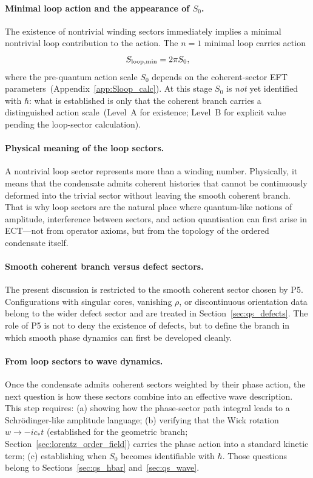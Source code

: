 \paragraph{Minimal loop action and the appearance of $S_0$.}
The existence of nontrivial winding sectors immediately implies a
minimal nontrivial loop contribution to the action.
The $n=1$ minimal loop carries action
\begin{equation}
  \label{eq:qs_loop_min}
  S_{\rm loop,min} = 2\pi S_0,
\end{equation}
where the pre-quantum action scale $S_0$ depends on the coherent-sector
EFT parameters~(Appendix~\ref{app:Sloop_calc}).
At this stage $S_0$ is \emph{not} yet identified with $\hbar$: what
is established is only that the coherent branch carries a distinguished
action scale~(Level~A for existence; Level~B for explicit value pending
the loop-sector calculation).

\paragraph{Physical meaning of the loop sectors.}
A nontrivial loop sector represents more than a winding number.
Physically, it means that the condensate admits coherent histories that
cannot be continuously deformed into the trivial sector without leaving
the smooth coherent branch.
That is why loop sectors are the natural place where quantum-like
notions of amplitude, interference between sectors, and action
quantisation can first arise in ECT---not from operator axioms, but
from the topology of the ordered condensate itself.

\paragraph{Smooth coherent branch versus defect sectors.}
The present discussion is restricted to the smooth coherent sector
chosen by P5.
Configurations with singular cores, vanishing $\rho$, or
discontinuous orientation data belong to the wider defect sector
and are treated in Section~\ref{sec:qs_defects}.
The role of P5 is not to deny the existence of defects, but to define
the branch in which smooth phase dynamics can first be developed
cleanly.

\paragraph{From loop sectors to wave dynamics.}
Once the condensate admits coherent sectors weighted by their phase
action, the next question is how these sectors combine into an
effective wave description.
This step requires: (a) showing how the phase-sector path integral
leads to a Schr\"odinger-like amplitude language; (b) verifying that
the Wick rotation $w\to -ic_*t$ (established for the geometric branch;
Section~\ref{sec:lorentz_order_field}) carries the phase action into a
standard kinetic term; (c) establishing when $S_0$ becomes
identifiable with $\hbar$.
Those questions belong to Sections~\ref{sec:qs_hbar}
and~\ref{sec:qs_wave}.

